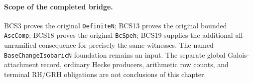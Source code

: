 \paragraph{Scope of the completed bridge.}
BCS3 proves the original \texttt{DefiniteN}; BCS13 proves the original
bounded \texttt{AscComp}; BCS18 proves the original \texttt{BcSpeh};
BCS19 supplies the additional all-unramified consequence for precisely
the same witnesses.  The named \texttt{BaseChangeIsobaricN} foundation
remains an input.  The separate global Galois-attachment record,
ordinary Hecke producers, arithmetic row counts, and terminal RH/GRH
obligations are not conclusions of this chapter.

